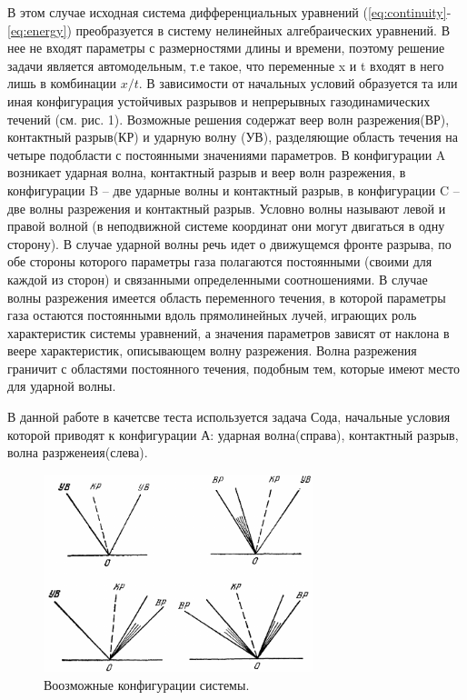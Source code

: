 \documentclass[a4paper,12pt]{extarticle}
\begin{document}
В этом случае исходная система дифференциальных уравнений (\ref{eq:continuity}-\ref{eq:energy}) преобразуется в систему нелинейных алгебраических уравнений. В нее не входят параметры с размерностями длины и времени, поэтому решение задачи является автомодельным, т.е такое, что переменные x и t входят в него лишь в комбинации \(x/t\).
В зависимости от начальных условий образуется та или иная
конфигурация устойчивых разрывов и непрерывных газодинамических течений (см. рис. 1). Возможные
решения содержат веер волн разрежения(ВР), контактный разрыв(КР) и ударную волну (УВ), разделяющие область
течения на четыре подобласти с постоянными значениями параметров. В конфигурации A возникает
ударная волна, контактный разрыв и веер волн разрежения, в конфигурации B – две ударные волны и
контактный разрыв, в конфигурации C – две волны разрежения и контактный разрыв. Условно волны
называют левой и правой волной (в неподвижной системе координат они могут двигаться в одну сторону). В случае ударной волны речь идет о движущемся фронте разрыва, по обе стороны которого параметры газа полагаются постоянными (своими для каждой из сторон) и связанными определенными соотношениями. В случае волны разрежения имеется область переменного течения, в которой параметры газа
остаются постоянными вдоль прямолинейных лучей, играющих роль характеристик системы уравнений,
а значения параметров зависят от наклона в веере характеристик, описывающем волну разрежения. Волна разрежения граничит с областями постоянного течения, подобным тем, которые имеют место для
ударной волны. 

В данной работе в качетсве теста используется задача Сода, начальные условия которой приводят к конфигурации А: ударная волна(справа), контактный разрыв, волна разрженеия(слева).
\begin{figure}[!htb]
	\centering
	\includegraphics[width=0.7\textwidth]{godunov1976_fig13-1.png}
	\caption{
		Воозможные конфигурации системы.
	}
	\label{fig:configurations}
\end{figure}
\end{document}
